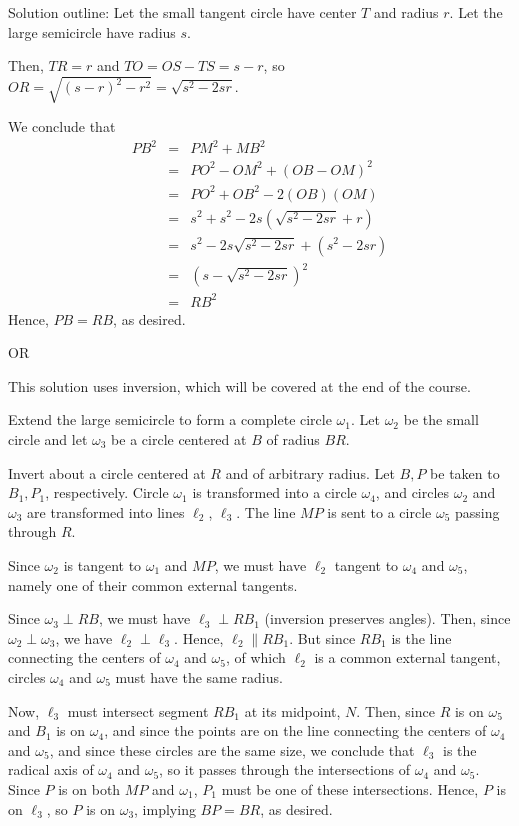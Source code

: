 \begin{mdsoln}
Solution outline:
Let the small tangent circle have center $T$ and radius $r$. Let the large semicircle have radius $s$.

Then, $TR=r$ and $TO=OS-TS=s-r$, so $OR=\sqrt{(s-r)^2-r^2}=\sqrt{s^2-2sr}$.

We conclude that\begin{eqnarray*}PB^2&=&PM^2+MB^2\\ &=& PO^2-OM^2+(OB-OM)^2\\ &=& PO^2+OB^2-2(OB)(OM)\\ &=& s^2+s^2-2s(\sqrt{s^2-2sr}+r)\\ &=& s^2-2s\sqrt{s^2-2sr}+(s^2-2sr)\\ &=&(s-\sqrt{s^2-2sr})^2\\ &=&RB^2\end{eqnarray*}
Hence, $PB=RB$, as desired.

OR

This solution uses inversion, which will be covered at the end of the course.

Extend the large semicircle to form a complete circle $\omega_1$. Let $\omega_2$ be the small circle and let $\omega_3$ be a circle centered at $B$ of radius $BR$.

Invert about a circle centered at $R$ and of arbitrary radius. Let $B,P$ be taken to $B_1,P_1$, respectively. Circle $\omega_1$ is transformed into a circle $\omega_4$, and circles $\omega_2$ and $\omega_3$ are transformed into lines $\ell_2$, $\ell_3$. The line $MP$ is sent to a circle $\omega_5$ passing through $R$.

Since $\omega_2$ is tangent to $\omega_1$ and $MP$, we must have $\ell_2$ tangent to $\omega_4$ and $\omega_5$, namely one of their common external tangents.

Since $\omega_3\perp RB$, we must have $\ell_3\perp RB_1$ (inversion preserves angles). Then, since $\omega_2\perp \omega_3$, we have $\ell_2\perp \ell_3$. Hence, $\ell_2\parallel RB_1$. But since $RB_1$ is the line connecting the centers of $\omega_4$ and $\omega_5$, of which $\ell_2$ is a common external tangent, circles $\omega_4$ and $\omega_5$ must have the same radius.

Now, $\ell_3$ must intersect segment $RB_1$ at its midpoint, $N$. Then, since $R$ is on $\omega_5$ and $B_1$ is on $\omega_4$, and since the points are on the line connecting the centers of $\omega_4$ and $\omega_5$, and since these circles are the same size, we conclude that $\ell_3$ is the radical axis of $\omega_4$ and $\omega_5$, so it passes through the intersections of $\omega_4$ and $\omega_5$. Since $P$ is on both $MP$ and $\omega_1$, $P_1$ must be one of these intersections. Hence, $P$ is on $\ell_3$, so $P$ is on $\omega_3$, implying $BP=BR$, as desired.
    
\end{mdsoln}

